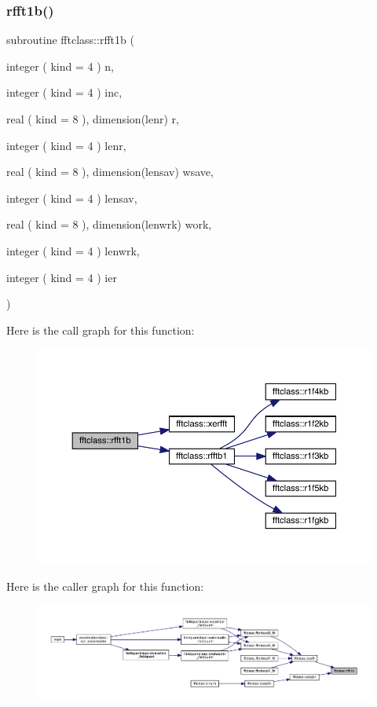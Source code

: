 \subsubsection{\texorpdfstring{rfft1b()}{rfft1b()}}
{\footnotesize\ttfamily subroutine fftclass\+::rfft1b (\begin{DoxyParamCaption}\item[{integer ( kind = 4 )}]{n,  }\item[{integer ( kind = 4 )}]{inc,  }\item[{real ( kind = 8 ), dimension(lenr)}]{r,  }\item[{integer ( kind = 4 )}]{lenr,  }\item[{real ( kind = 8 ), dimension(lensav)}]{wsave,  }\item[{integer ( kind = 4 )}]{lensav,  }\item[{real ( kind = 8 ), dimension(lenwrk)}]{work,  }\item[{integer ( kind = 4 )}]{lenwrk,  }\item[{integer ( kind = 4 )}]{ier }\end{DoxyParamCaption})}

Here is the call graph for this function\+:\nopagebreak
\begin{figure}[H]
\begin{center}
\leavevmode
\includegraphics[width=350pt]{namespacefftclass_a2bdd31e65a4abb79ed9e0eeaa71cee6b_cgraph}
\end{center}
\end{figure}
Here is the caller graph for this function\+:\nopagebreak
\begin{figure}[H]
\begin{center}
\leavevmode
\includegraphics[width=350pt]{namespacefftclass_a2bdd31e65a4abb79ed9e0eeaa71cee6b_icgraph}
\end{center}
\end{figure}
\mbox{\label{namespacefftclass_ad5aa2059236e01ea65aecda114c3f45f}} 
